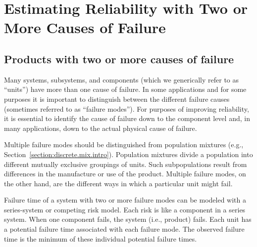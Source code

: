 \section{Estimating Reliability with Two or More Causes of Failure}
\label{section.multiple.causes}
\subsection{Products with two or more causes of failure}

Many systems, subsystems, and components (which we generically refer
to as ``units'') have more than one cause of failure.  In some
applications and for some purposes it is important to distinguish
between the different failure causes (sometimes referred to as
``failure modes''). For purposes of improving reliability, it is
essential to identify the cause of failure down to the component
level and, in many applications, down to the actual physical cause
of failure.

Multiple failure modes should be distinguished from population
mixtures (e.g.,
Section~\ref{section:discrete.mix.intro}). Population mixtures
divide a population into different mutually exclusive groupings of
units.  Such subpopulations result from differences in the
manufacture or use of the product.  Multiple failure modes, on the
other hand, are the different ways in which a particular unit might
fail.

Failure time of a system with two or more failure modes can be
modeled with a series-system or competing risk model.  Each risk is
like a component in a series system.  When one component fails, the
system (i.e., product) fails.  Each unit has a potential failure
time associated with each failure mode. The observed  failure time
is the minimum of these individual potential failure times.

